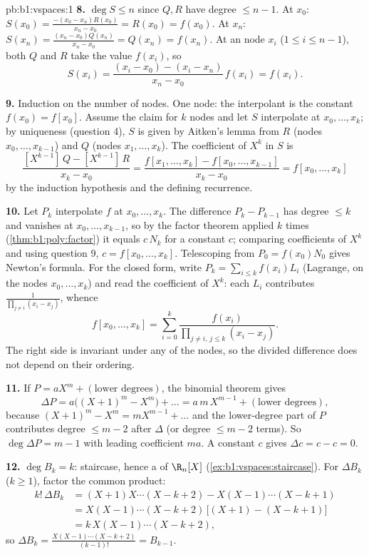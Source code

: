 \begin{solution}{pb:b1:vspaces:1}
\textbf{8.} $\deg S \leq n$ since $Q, R$ have degree $\leq n - 1$.
At $x_0$: $S(x_0) = \frac{-(x_0 - x_n) R(x_0)}{x_n - x_0} =
R(x_0) = f(x_0)$. At $x_n$: $S(x_n) = \frac{(x_n - x_0)
Q(x_n)}{x_n - x_0} = Q(x_n) = f(x_n)$. At an  node $x_i$
($1 \leq i \leq n-1$), both $Q$ and $R$ take the value $f(x_i)$,
so
\[
S(x_i) = \frac{(x_i - x_0) - (x_i - x_n)}{x_n - x_0}\, f(x_i)
= f(x_i) .
\]

\textbf{9.} Induction on the number of nodes. One node: the
interpolant is the constant $f(x_0) = f[x_0]$. Assume the claim
for $k$ nodes and let $S$ interpolate at $x_0, \dots, x_k$; by
uniqueness (question 4), $S$ is given by Aitken's lemma from $R$
(nodes $x_0, \dots, x_{k-1}$) and $Q$ (nodes $x_1, \dots, x_k$).
The coefficient of $X^{k}$ in $S$ is
\[
\frac{[X^{k-1}]\,Q - [X^{k-1}]\,R}{x_k - x_0}
= \frac{f[x_1, \dots, x_k] - f[x_0, \dots, x_{k-1}]}{x_k - x_0}
= f[x_0, \dots, x_k]
\]
by the induction hypothesis and the defining recurrence.

\textbf{10.} Let $P_k$ interpolate $f$ at $x_0, \dots, x_k$. The
difference $P_k - P_{k-1}$ has degree $\leq k$ and vanishes at
$x_0, \dots, x_{k-1}$, so by the factor theorem applied $k$ times
(\cref{thm:b1:poly:factor}) it equals $c\,N_k$ for a constant $c$;
comparing coefficients of $X^{k}$ and using question 9, $c =
f[x_0, \dots, x_k]$. Telescoping from $P_0 = f(x_0) N_0$ gives
Newton's formula. For the closed form, write $P_k = \sum_{i \leq
k} f(x_i) L_i$ (Lagrange, on the nodes $x_0, \dots, x_k$) and read
the coefficient of $X^{k}$: each $L_i$ contributes
$\frac{1}{\prod_{j \neq i}(x_i - x_j)}$, whence
\[
f[x_0, \dots, x_k] = \sum_{i=0}^{k}
\frac{f(x_i)}{\prod_{j \neq i,\, j \leq k}(x_i - x_j)} .
\]
The right side is invariant under any  of the nodes, so
the divided difference does not depend on their ordering.

\textbf{11.} If $P = a X^m + (\text{lower degrees})$, the binomial
theorem gives
\[
\Delta P = a\bigl((X+1)^m - X^m\bigr) + \dots
= a\,m\,X^{m-1} + (\text{lower degrees}),
\]
because $(X+1)^m - X^m = m X^{m-1} + \dots$ and the lower-degree
part of $P$ contributes degree $\leq m - 2$ after $\Delta$ (or
degree $\leq m-2$ terms). So $\deg \Delta P = m - 1$ with leading
coefficient $m a$. A constant $c$ gives $\Delta c = c - c = 0$.

\textbf{12.} $\deg B_k = k$: staircase, hence a  of
$\R_n[X]$ (\cref{ex:b1:vspaces:staircase}). For $\Delta B_k$
($k \geq 1$), factor the common product:
\begin{align*}
k!\,\Delta B_k
&= (X+1)X\cdots(X-k+2) - X(X-1)\cdots(X-k+1) \\
&= X(X-1)\cdots(X-k+2)\,\bigl[(X+1) - (X-k+1)\bigr] \\
&= k\,X(X-1)\cdots(X-k+2),
\end{align*}
so $\Delta B_k = \frac{X(X-1)\cdots(X-k+2)}{(k-1)!} = B_{k-1}$.


\end{solution}

